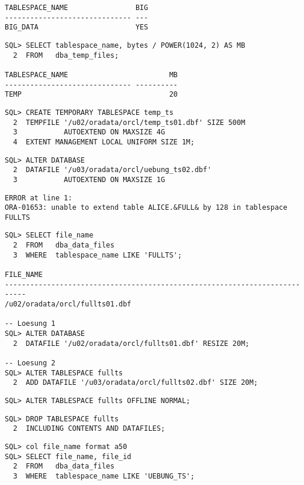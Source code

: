 \begin{enumerate}
\begin{lstlisting}[language=oracle_sql]
TABLESPACE_NAME                BIG
------------------------------ ---
BIG_DATA                       YES

      \end{lstlisting}
    
      \begin{lstlisting}[language=oracle_sql]
SQL> SELECT tablespace_name, bytes / POWER(1024, 2) AS MB
  2  FROM   dba_temp_files;

TABLESPACE_NAME                        MB
------------------------------ ----------
TEMP                                   20
      \end{lstlisting}
    
      \begin{lstlisting}[language=oracle_sql]
SQL> CREATE TEMPORARY TABLESPACE temp_ts
  2  TEMPFILE '/u02/oradata/orcl/temp_ts01.dbf' SIZE 500M
  3           AUTOEXTEND ON MAXSIZE 4G
  4  EXTENT MANAGEMENT LOCAL UNIFORM SIZE 1M;
      \end{lstlisting}
    
      \begin{lstlisting}[language=oracle_sql]
SQL> ALTER DATABASE
  2  DATAFILE '/u03/oradata/orcl/uebung_ts02.dbf'
  3           AUTOEXTEND ON MAXSIZE 1G
      \end{lstlisting}
    
    
		\begin{lstlisting}[language=oracle_sql]
ERROR at line 1:
ORA-01653: unable to extend table ALICE.&FULL& by 128 in tablespace FULLTS
		\end{lstlisting}
\clearpage		
		
      \begin{lstlisting}[language=oracle_sql]
SQL> SELECT file_name
  2  FROM   dba_data_files
  3  WHERE  tablespace_name LIKE 'FULLTS';

FILE_NAME
---------------------------------------------------------------------------
/u02/oradata/orcl/fullts01.dbf

-- Loesung 1
SQL> ALTER DATABASE
  2  DATAFILE '/u02/oradata/orcl/fullts01.dbf' RESIZE 20M;

-- Loesung 2
SQL> ALTER TABLESPACE fullts
  2  ADD DATAFILE '/u03/oradata/orcl/fullts02.dbf' SIZE 20M;
      \end{lstlisting}
    
      \begin{lstlisting}[language=oracle_sql]
SQL> ALTER TABLESPACE fullts OFFLINE NORMAL;
      \end{lstlisting}
    
      \begin{lstlisting}[language=oracle_sql]
SQL> DROP TABLESPACE fullts
  2  INCLUDING CONTENTS AND DATAFILES;
      \end{lstlisting}
\clearpage	  
    
      \begin{lstlisting}[language=oracle_sql,alsolanguage=sqlplus]
SQL> col file_name format a50
SQL> SELECT file_name, file_id
  2  FROM   dba_data_files
  3  WHERE  tablespace_name LIKE 'UEBUNG_TS';


\end{lstlisting}
\end{enumerate}
